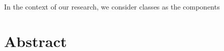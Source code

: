 \newcommand{\din}[0]{\ensuremath{\delta_{in}}}
\newcommand{\dout}[0]{\ensuremath{\delta_{out}}}

%

%
%


%
%
%
%
%
%
%
%


In the context of our research, we consider classes as the components

\section{Abstract} 

